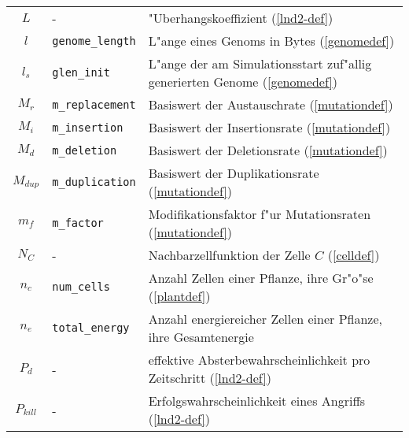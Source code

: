 \begin{appendix}
\begin{tabularx}{\linewidth}{|c|l|X|}
$L$          & -                        & "Uberhangskoeffizient (\ref{lnd2-def}) \\
$l$          & \verb|genome_length|     & L"ange eines Genoms in Bytes (\ref{genomedef}) \\
$l_s$        & \verb|glen_init|         & L"ange der am Simulationsstart zuf"allig generierten Genome (\ref{genomedef}) \\
$M_r$        & \verb|m_replacement|     & Basiswert der Austauschrate (\ref{mutationdef}) \\
$M_i$        & \verb|m_insertion|       & Basiswert der Insertionsrate (\ref{mutationdef}) \\
$M_d$        & \verb|m_deletion|        & Basiswert der Deletionsrate (\ref{mutationdef}) \\
$M_{\mathit{dup}}$  & \verb|m_duplication|     & Basiswert der Duplikationsrate (\ref{mutationdef}) \\
$m_f$        & \verb|m_factor|          & Modifikationsfaktor f"ur Mutationsraten (\ref{mutationdef}) \\
$N_C$        & -                        & Nachbarzellfunktion der Zelle $C$ (\ref{celldef}) \\
$n_c$        & \verb|num_cells|         & Anzahl Zellen einer Pflanze, ihre Gr"o"se (\ref{plantdef}) \\
$n_e$        & \verb|total_energy|      & Anzahl energiereicher Zellen einer Pflanze, ihre Gesamtenergie \\
$P_d$        & -                        & effektive Absterbewahrscheinlichkeit pro Zeitschritt (\ref{lnd2-def}) \\
$P_{\mathit{kill}}$ & -                        & Erfolgswahrscheinlichkeit eines Angriffs (\ref{lnd2-def}) \\ \hline
\end{tabularx}


\end{appendix}

